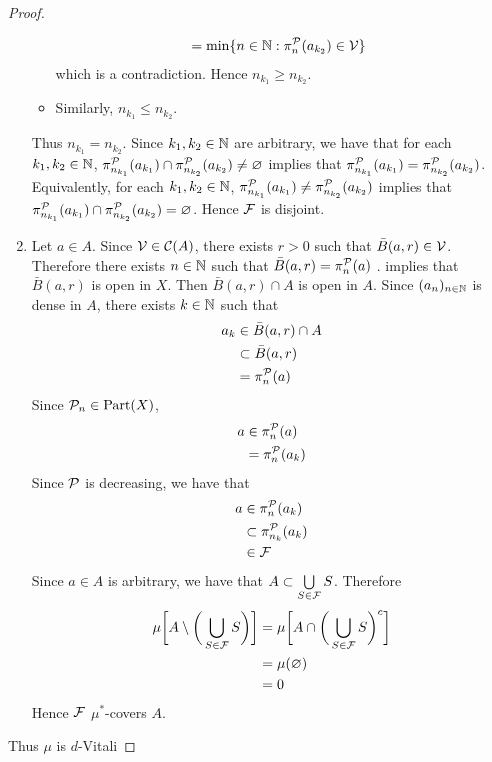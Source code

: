 \documentclass{book}
\begin{document}
\begin{proof}
\begin{enumerate}
\begin{itemize}
\begin{align*}
					& = \min \{n \in \mathbb{N}: \pi^{\mathcal{P}}_n(a_{k_2}) \in \mathcal{V}\}
				\end{align*}
				which is a contradiction. Hence $n_{k_1} \geq n_{k_2}$. 
				\item Similarly, $n_{k_1} \leq n_{k_2}$.
			\end{itemize}
			Thus $n_{k_1} = n_{k_2}$. Since $k_1, k_2 \in \mathbb{N}$ are arbitrary, we have that for each $k_1, k_2 \in \mathbb{N}$, $\pi^{\mathcal{P}}_{n_{k_1}}(a_{k_1}) \cap \pi^{\mathcal{P}}_{n_{k_2}}(a_{k_2}) \neq \varnothing$ implies that $\pi^{\mathcal{P}}_{n_{k_1}}(a_{k_1}) = \pi^{\mathcal{P}}_{n_{k_2}}(a_{k_2})$. Equivalently, for each $k_1, k_2 \in \mathbb{N}$, $\pi^{\mathcal{P}}_{n_{k_1}}(a_{k_1}) \neq \pi^{\mathcal{P}}_{n_{k_2}}(a_{k_2})$ implies that $\pi^{\mathcal{P}}_{n_{k_1}}(a_{k_1}) \cap \pi^{\mathcal{P}}_{n_{k_2}}(a_{k_2}) = \varnothing$. Hence $\mathcal{F}$ is disjoint.
			\item Let $a \in A$. Since $\mathcal{V} \in \mathcal{C}(A)$, there exists $r > 0$ such that $\bar{B}(a, r) \in \mathcal{V}$. Therefore there exists $n \in \mathbb{N}$ such that $\bar{B}(a, r) = \pi^{\mathcal{P}}_n(a)$ .  implies that $\bar{B}(a, r)$ is open in $X$. Then $\bar{B}(a, r) \cap A$ is open in $A$. Since $(a_n)_{n \in \mathbb{N}}$ is dense in $A$, there exists $k \in \mathbb{N}$ such that 
			\begin{align*}
				a_k 
				& \in \bar{B}(a, r) \cap A \\
				& \subset \bar{B}(a, r) \\
				& = \pi^{\mathcal{P}}_n(a)
			\end{align*}
			Since $\mathcal{P}_n \in \operatorname*{\text{Part}}(X)$, 
			\begin{align*}
				a
				& \in \pi^{\mathcal{P}}_n(a) \\
				& = \pi^{\mathcal{P}}_n(a_k) \\
			\end{align*}
			Since $\mathcal{P}$ is decreasing, we have that 
			\begin{align*}
				a
				& \in \pi^{\mathcal{P}}_n(a_k) \\
				& \subset \pi^{\mathcal{P}}_{n_k}(a_k) \\
				& \in \mathcal{F} 
			\end{align*}
			Since $a \in A$ is arbitrary, we have that $A \subset \bigcup\limits_{S \in \mathcal{F}}S$. Therefore 
			\begin{align*}
				\mu \bigg[ A \setminus \bigg(\bigcup_{S \in \mathcal{F}}S \bigg) \bigg] 
				& = \mu \bigg[ A \cap \bigg(\bigcup_{S \in \mathcal{F}}S \bigg)^c \bigg] \\ 
				& = \mu(\varnothing) \\
				& = 0
			\end{align*}
			Hence $\mathcal{F}$ $\mu^*$-covers $A$. 
		\end{enumerate}
		Thus $\mu$ is $d$-Vitali
	\end{proof}
\end{document}
